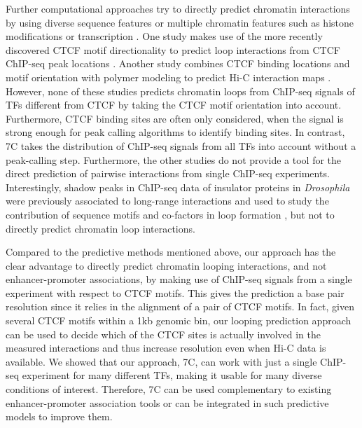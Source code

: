 \documentclass[a4paper,twoside=true,openright,parskip=full,chapterprefix=true,11pt,headings=normal,bibliography=totoc,listof=totoc,titlepage=on,captions=tableabove,draft=false]{scrreprt}
\theoremstyle{definition}
\theoremstyle{definition}
\theoremstyle{definition}
\theoremstyle{remark}
\begin{document}
Further computational approaches try to directly predict chromatin
interactions by using diverse sequence features \citep{Nikumbh2017} or
multiple chromatin features such as histone modifications
\citep{Brackley2016, Chen2016} or transcription \citep{Rowley2017}. One
study makes use of the more recently discovered CTCF motif
directionality to predict loop interactions from CTCF ChIP-seq peak
locations \citep{Oti2016}. Another study combines CTCF binding locations
and motif orientation with polymer modeling to predict Hi-C interaction
maps \citep{Sanborn2015}. However, none of these studies predicts
chromatin loops from ChIP-seq signals of TFs different from CTCF by
taking the CTCF motif orientation into account. Furthermore, CTCF
binding sites are often only considered, when the signal is strong
enough for peak calling algorithms to identify binding sites. In
contrast, 7C takes the distribution of ChIP-seq signals from all TFs
into account without a peak-calling step. Furthermore, the other studies
do not provide a tool for the direct prediction of pairwise interactions
from single ChIP-seq experiments. Interestingly, shadow peaks in
ChIP-seq data of insulator proteins in \emph{Drosophila} were previously
associated to long-range interactions \citep{Liang2014} and used to
study the contribution of sequence motifs and co-factors in loop
formation \citep{Mourad2017}, but not to directly predict chromatin loop
interactions.

Compared to the predictive methods mentioned above, our approach has the
clear advantage to directly predict chromatin looping interactions, and
not enhancer-promoter associations, by making use of ChIP-seq signals
from a single experiment with respect to CTCF motifs. This gives the
prediction a base pair resolution since it relies in the alignment of a
pair of CTCF motifs. In fact, given several CTCF motifs within a 1kb
genomic bin, our looping prediction approach can be used to decide which
of the CTCF sites is actually involved in the measured interactions and
thus increase resolution even when Hi-C data is available. We showed
that our approach, 7C, can work with just a single ChIP-seq experiment
for many different TFs, making it usable for many diverse conditions of
interest. Therefore, 7C can be used complementary to existing
enhancer-promoter association tools or can be integrated in such
predictive models to improve them.
\end{document}
